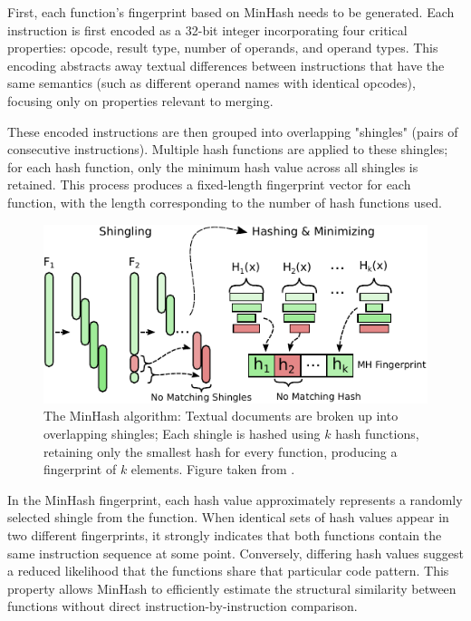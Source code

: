 First, each function's fingerprint based on MinHash needs to be generated. Each instruction is first encoded as a 32-bit integer incorporating four critical properties: opcode, result type, number of operands, and operand types. This encoding abstracts away textual differences between instructions that have the same semantics (such as different operand names with identical opcodes), focusing only on properties relevant to merging.

These encoded instructions are then grouped into overlapping "shingles" (pairs of consecutive instructions). Multiple hash functions are applied to these shingles; for each hash function, only the minimum hash value across all shingles is retained. This process produces a fixed-length fingerprint vector for each function, with the length corresponding to the number of hash functions used.

\begin{figure}[h!]
\centering
\includegraphics[scale=1]{Figures/F3M_MinHash.pdf}
\caption{The MinHash algorithm: Textual documents are broken up into overlapping shingles; Each shingle is hashed using $k$ hash functions, retaining only the smallest hash for every function, producing a fingerprint of $k$ elements. Figure taken from  \cite{F3M:FastFocusedFunctionMerging}.}\label{fig:testsvg}
\end{figure}

In the MinHash fingerprint, each hash value approximately represents a randomly selected shingle from the function. When identical sets of hash values appear in two different fingerprints, it strongly indicates that both functions contain the same instruction sequence at some point. Conversely, differing hash values suggest a reduced likelihood that the functions share that particular code pattern. This property allows MinHash to efficiently estimate the structural similarity between functions without direct instruction-by-instruction comparison.


